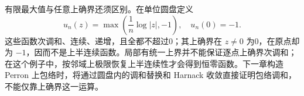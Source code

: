 \ProseParagraphBreak

有限最大值与任意上确界还须区别。在单位圆盘定义
\[
 u_n(z)=\max\left(\frac1n\log|z|,-1\right),
 \quad u_n(0)=-1.
\]
这些函数次调和、连续、递增，且全都不超过0；其上确界在 \(z\ne0\) 为0，在原点却为 \(-1\)，因而不是上半连续函数。局部有统一上界并不能保证逐点上确界次调和；在这个例子中，按邻域上极限恢复上半连续性才会得到恒零函数。下一章构造 Perron 上包络时，将通过圆盘内的调和替换和 Harnack 收敛直接证明包络调和，不能仅靠上确界这一运算。

